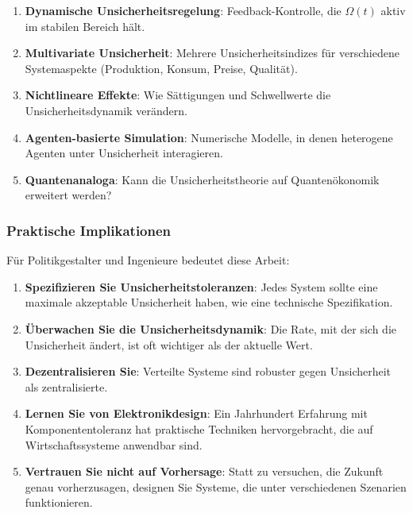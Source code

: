 \documentclass[a4paper,12pt,twoside]{report}
\theoremstyle{definition}
\begin{document}
\begin{enumerate}
    \item \textbf{Dynamische Unsicherheitsregelung}: Feedback-Kontrolle, die $\Omega(t)$ aktiv im stabilen Bereich hält.
    
    \item \textbf{Multivariate Unsicherheit}: Mehrere Unsicherheitsindizes für verschiedene Systemaspekte (Produktion, Konsum, Preise, Qualität).
    
    \item \textbf{Nichtlineare Effekte}: Wie Sättigungen und Schwellwerte die Unsicherheitsdynamik verändern.
    
    \item \textbf{Agenten-basierte Simulation}: Numerische Modelle, in denen heterogene Agenten unter Unsicherheit interagieren.
    
    \item \textbf{Quantenanaloga}: Kann die Unsicherheitstheorie auf Quantenökonomik erweitert werden?
\end{enumerate}

\subsubsection{Praktische Implikationen}

Für Politikgestalter und Ingenieure bedeutet diese Arbeit:

\begin{enumerate}
    \item \textbf{Spezifizieren Sie Unsicherheitstoleranzen}: Jedes System sollte eine maximale akzeptable Unsicherheit haben, wie eine technische Spezifikation.
    
    \item \textbf{Überwachen Sie die Unsicherheitsdynamik}: Die Rate, mit der sich die Unsicherheit ändert, ist oft wichtiger als der aktuelle Wert.
    
    \item \textbf{Dezentralisieren Sie}: Verteilte Systeme sind robuster gegen Unsicherheit als zentralisierte.
    
    \item \textbf{Lernen Sie von Elektronikdesign}: Ein Jahrhundert Erfahrung mit Komponententoleranz hat praktische Techniken hervorgebracht, die auf Wirtschaftssysteme anwendbar sind.
    
    \item \textbf{Vertrauen Sie nicht auf Vorhersage}: Statt zu versuchen, die Zukunft genau vorherzusagen, designen Sie Systeme, die unter verschiedenen Szenarien funktionieren.
\end{enumerate}
\end{document}

